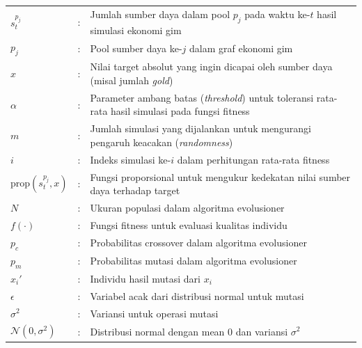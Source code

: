 \begin{center}
\begin{tabular}{p{2.5cm}p{0.2cm}p{10cm}}
$s^{p_j}_t$ & : & Jumlah sumber daya dalam pool $p_j$ pada waktu ke-$t$ hasil simulasi ekonomi gim \\
$p_j$ & : & Pool sumber daya ke-$j$ dalam graf ekonomi gim \\
$x$ & : & Nilai target absolut yang ingin dicapai oleh sumber daya (misal jumlah \textit{gold}) \\
$\alpha$ & : & Parameter ambang batas (\textit{threshold}) untuk toleransi rata-rata hasil simulasi pada fungsi fitness \\
$m$ & : & Jumlah simulasi yang dijalankan untuk mengurangi pengaruh keacakan (\textit{randomness}) \\
$i$ & : & Indeks simulasi ke-$i$ dalam perhitungan rata-rata fitness \\
$\mathrm{prop}(s^{p_j}_t, x)$ & : & Fungsi proporsional untuk mengukur kedekatan nilai sumber daya terhadap target \\
$N$ & : & Ukuran populasi dalam algoritma evolusioner \\
$f(\cdot)$ & : & Fungsi fitness untuk evaluasi kualitas individu \\
$p_c$ & : & Probabilitas crossover dalam algoritma evolusioner \\
$p_m$ & : & Probabilitas mutasi dalam algoritma evolusioner \\
$x_i'$ & : & Individu hasil mutasi dari $x_i$ \\
$\epsilon$ & : & Variabel acak dari distribusi normal untuk mutasi \\
$\sigma^2$ & : & Variansi untuk operasi mutasi \\
$\mathcal{N}(0, \sigma^2)$ & : & Distribusi normal dengan mean 0 dan variansi $\sigma^2$ \\
\end{tabular}
\end{center}